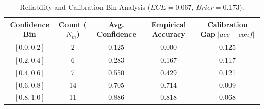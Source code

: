 \begin{table}[t]
\centering
\small
\caption{Reliability and Calibration Bin Analysis ($ECE=0.067$, $Brier=0.173$).}
\label{tab:calibration_bins}
\begin{tabular}{ccccc}
\toprule
\textbf{Confidence Bin} & \textbf{Count ($N_m$)} & \textbf{Avg. Confidence} & \textbf{Empirical Accuracy} & \textbf{Calibration Gap $|acc - conf|$} \\
\midrule
$[0.0, 0.2]$ & 2 & 0.125 & 0.000 & 0.125 \\
$[0.2, 0.4]$ & 6 & 0.283 & 0.167 & 0.117 \\
$[0.4, 0.6]$ & 7 & 0.550 & 0.429 & 0.121 \\
$[0.6, 0.8]$ & 14 & 0.705 & 0.714 & 0.009 \\
$[0.8, 1.0]$ & 11 & 0.886 & 0.818 & 0.068 \\
\bottomrule
\end{tabular}
\end{table}